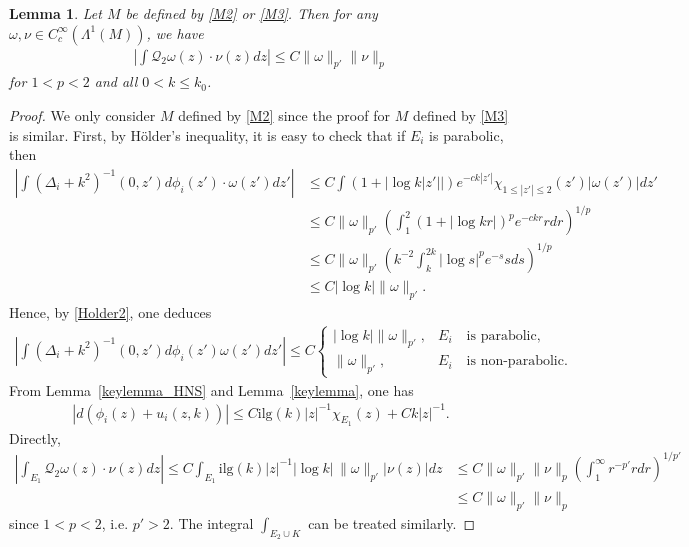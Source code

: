\documentclass[12pt]{amsart}
\newtheorem{lemma}[theorem]{Lemma}
\begin{document}
\begin{lemma}\label{remedy}
Let $M$ be defined by \eqref{M2} or \eqref{M3}. Then for any $\omega, \nu \in C_c^\infty(\Lambda^1(M))$, we have
\begin{align*}
    \left|\int \mathcal{Q}_2\omega(z) \cdot \nu(z) dz \right| \le C \|\omega\|_{p'} \|\nu\|_p
\end{align*}
for $1<p<2$ and all $0<k\le k_0$.

\end{lemma}

\begin{proof}
We only consider $M$ defined by \eqref{M2} since the proof for $M$ defined by \eqref{M3} is similar. First, by Hölder's inequality, it is easy to check that if $E_i$ is parabolic, then
\begin{align}\label{Holder}
    \left|\int (\Delta_i+k^2)^{-1}(0,z') d\phi_i(z') \cdot \omega(z') dz' \right| &\le C \int \left(1 + \left|\log{k|z'|} \right|\right) e^{-ck|z'|} \chi_{1\le |z'|\le 2}(z') |\omega(z')| dz'\\ \nonumber
    &\le C \|\omega\|_{p'} \left(\int_1^2 \left(1 + \left|\log{kr}\right|\right)^{p} e^{-ckr} rdr  \right)^{1/p}\\ \nonumber
    &\le C \|\omega\|_{p'} \left( k^{-2} \int_k^{2k} |\log{s}|^{p} e^{-s}  s ds \right)^{1/p}\\ \nonumber
    &\le C |\log{k}| \|\omega\|_{p'}.
\end{align}
Hence, by \eqref{Holder2}, one deduces
\begin{align*}
    \left|\int (\Delta_i+k^2)^{-1}(0,z') d\phi_i(z') \omega(z') dz'\right| \le C\begin{cases}
        |\log{k}| \|\omega\|_{p'}, & E_i\quad  \textrm{is parabolic},\\
        \|\omega\|_{p'}, & E_i \quad  \textrm{is non-parabolic}.
    \end{cases}
\end{align*}
From Lemma~\ref{keylemma_HNS} and Lemma~\ref{keylemma}, one has 
\begin{align*}
    |d(\phi_i(z) + u_i(z,k))|\le C \textrm{ilg}(k)|z|^{-1} \chi_{E_1}(z) + Ck|z|^{-1}.
\end{align*}
Directly, 
\begin{align*}
    \left|\int_{E_1} \mathcal{Q}_2\omega(z) \cdot \nu(z) dz \right| \le C\int_{E_1} \textrm{ilg}(k)|z|^{-1} |\log{k}| \, \|\omega\|_{p'} |\nu(z)| dz &\le C \|\omega\|_{p'} \|\nu\|_p \left( \int_1^\infty r^{-p'} rdr \right)^{1/p'}\\
    &\le C \|\omega\|_{p'} \|\nu\|_p
\end{align*}
since $1<p<2$, i.e. $p'>2$. The integral $ \int_{E_2\cup K}$ can be treated similarly. 






\end{proof}
\end{document}
